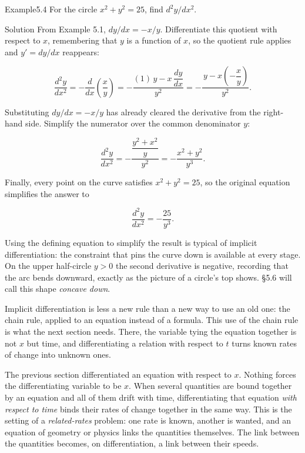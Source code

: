 \documentclass[a4paper,12pt,oneside]{memoir}
\begin{document}
\begin{workedexample}
\begin{envexample}{Example}{5.4}{}
For the circle \(x^{2} + y^{2} = 25\), find \(d^{2}y/dx^{2}\).
\end{envexample}
\begin{envsolution}{Solution}{}{}
From Example 5.1, \(dy/dx = -x/y\). Differentiate this quotient with respect to \(x\), remembering that \(y\) is a function of \(x\), so the quotient rule applies and \(y' = dy/dx\) reappears:

\[ \frac{d^{2}y}{dx^{2}} = -\frac{d}{dx}\!\left(\frac{x}{y}\right) = -\frac{(1)\,y - x\,\dfrac{dy}{dx}}{y^{2}} = -\frac{\,y - x\!\left(-\dfrac{x}{y}\right)}{y^{2}}. \]

Substituting \(dy/dx = -x/y\) has already cleared the derivative from the right-hand side. Simplify the numerator over the common denominator \(y\):

\[ \frac{d^{2}y}{dx^{2}} = -\frac{\dfrac{y^{2} + x^{2}}{y}}{y^{2}} = -\frac{x^{2} + y^{2}}{y^{3}}. \]

Finally, every point on the curve satisfies \(x^{2} + y^{2} = 25\), so the original equation simplifies the answer to

\[ \frac{d^{2}y}{dx^{2}} = -\frac{25}{y^{3}}. \]

Using the defining equation to simplify the result is typical of implicit differentiation: the constraint that pins the curve down is available at every stage. On the upper half-circle \(y > 0\) the second derivative is negative, recording that the arc bends downward, exactly as the picture of a circle’s top shows. §5.6 will call this shape \emph{concave down}. \qedmark
\end{envsolution}
\end{workedexample}
Implicit differentiation is less a new rule than a new way to use an old one: the chain rule, applied to an equation instead of a formula. This use of the chain rule is what the next section needs. There, the variable tying the equation together is not \(x\) but time, and differentiating a relation with respect to \(t\) turns known rates of change into unknown ones.


The previous section differentiated an equation with respect to \(x\). Nothing forces the differentiating variable to be \(x\). When several quantities are bound together by an equation and all of them drift with time, differentiating that equation \emph{with respect to time} binds their rates of change together in the same way. This is the setting of a \emph{related-rates} problem: one rate is known, another is wanted, and an equation of geometry or physics links the quantities themselves. The link between the quantities becomes, on differentiation, a link between their speeds.
\end{document}
